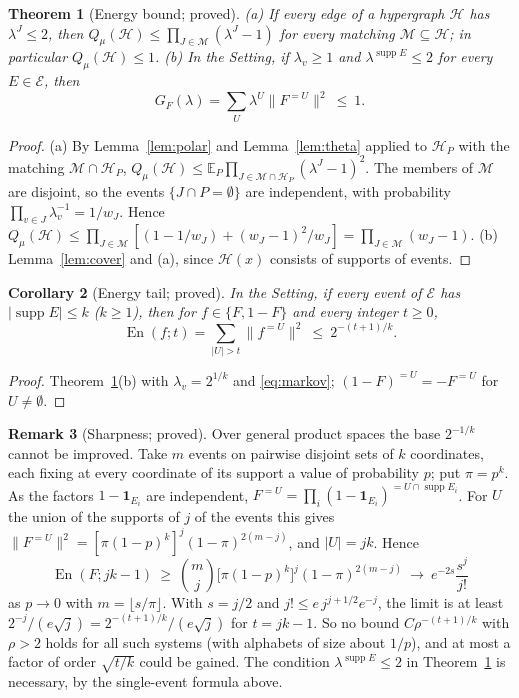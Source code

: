 \documentclass[11pt,reqno]{amsart}
\newtheorem{theorem}{Theorem}[section]
\newtheorem{corollary}[theorem]{Corollary}
\theoremstyle{definition}
\newtheorem{remark}[theorem]{Remark}
\newcommand{\cE}{\mathcal E}
\newcommand{\E}{\mathbb E}
\newcommand{\supp}{\operatorname{supp}}
\newcommand{\energy}{\operatorname{En}}
\newcommand{\Ho}{\mathcal H}
\newcommand{\cM}{\mathcal M}
\begin{document}
\begin{theorem}[Energy bound; proved]\label{thm:C1}
\textup{(a)} If every edge of a hypergraph $\Ho$ has $\lambda^J\le2$, then
$Q_\mu(\Ho)\le\prod_{J\in\cM}(\lambda^J-1)$ for every matching $\cM\subseteq\Ho$; in
particular $Q_\mu(\Ho)\le1$.
\textup{(b)} In the Setting, if $\lambda_v\ge1$ and $\lambda^{\supp E}\le2$ for every
$E\in\cE$, then
\[
 G_F(\lambda)=\sum_U\lambda^U\|F^{=U}\|^2\ \le\ 1 .
\]
\end{theorem}

\begin{proof}
(a) By Lemma~\ref{lem:polar} and Lemma~\ref{lem:theta} applied to $\Ho_P$ with the
matching $\cM\cap\Ho_P$, $Q_\mu(\Ho)\le\E_P\prod_{J\in\cM\cap\Ho_P}(\lambda^J-1)^2$.  The
members of $\cM$ are disjoint, so the events $\{J\cap P=\emptyset\}$ are independent,
with probability $\prod_{v\in J}\lambda_v^{-1}=1/w_J$.  Hence
$Q_\mu(\Ho)\le\prod_{J\in\cM}[(1-1/w_J)+(w_J-1)^2/w_J]=\prod_{J\in\cM}(w_J-1)$.
(b) Lemma~\ref{lem:cover} and (a), since $\Ho(x)$ consists of supports of events.
\end{proof}

\begin{corollary}[Energy tail; proved]\label{cor:tail}
In the Setting, if every event of $\cE$ has $|\supp E|\le k$ ($k\ge1$), then for
$f\in\{F,1-F\}$ and every integer $t\ge0$,
\[
 \energy(f;t)=\sum_{|U|>t}\|f^{=U}\|^2\ \le\ 2^{-(t+1)/k}.
\]
\end{corollary}

\begin{proof}
Theorem~\ref{thm:C1}(b) with $\lambda_v=2^{1/k}$ and \eqref{eq:markov};
$(1-F)^{=U}=-F^{=U}$ for $U\ne\emptyset$.
\end{proof}

\begin{remark}[Sharpness; proved]\label{rem:sharp}
Over general product spaces the base $2^{-1/k}$ cannot be improved.  Take
$m$ events on pairwise disjoint sets of $k$ coordinates, each fixing at every
coordinate of its support a value of probability $p$; put $\pi=p^k$.  As the
factors $1-\mathbf 1_{E_i}$ are independent, $F^{=U}=\prod_i(1-\mathbf 1_{E_i})^{=U\cap\supp E_i}$.
For $U$ the union of the supports of $j$ of the events this gives
$\|F^{=U}\|^2=[\pi(1-p)^k]^j(1-\pi)^{2(m-j)}$, and $|U|=jk$.  Hence
\[
 \energy(F;jk-1)\ \ge\ \binom mj\big[\pi(1-p)^k\big]^j(1-\pi)^{2(m-j)}
 \ \longrightarrow\ e^{-2s}\frac{s^j}{j!}
\]
as $p\to0$ with $m=\lfloor s/\pi\rfloor$.  With $s=j/2$ and $j!\le e\,j^{j+1/2}e^{-j}$,
the limit is at least $2^{-j}/(e\sqrt j)=2^{-(t+1)/k}/(e\sqrt j)$ for $t=jk-1$.  So no
bound $C\rho^{-(t+1)/k}$ with $\rho>2$ holds for all such systems (with alphabets
of size about $1/p$), and at most a factor of order $\sqrt{t/k}$ could be
gained.  The condition $\lambda^{\supp E}\le2$ in
Theorem~\ref{thm:C1} is necessary, by the single-event formula above.
\end{remark}
\end{document}
